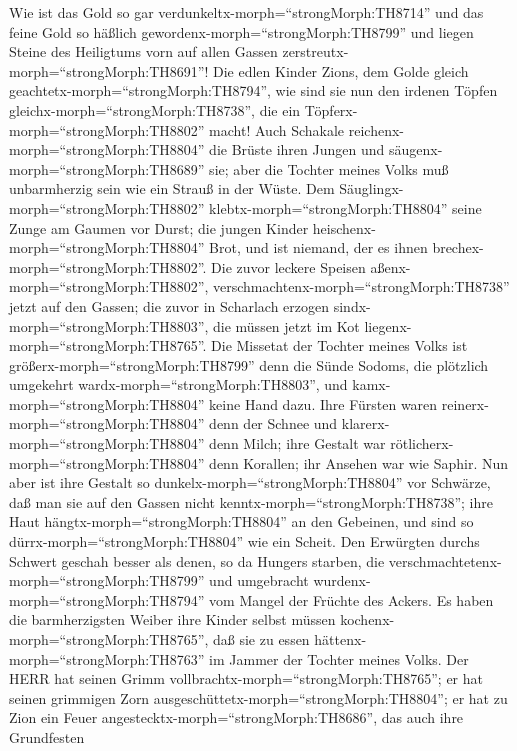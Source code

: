  Wie ist das Gold so gar
verdunkeltx-morph=``strongMorph:TH8714'' und das feine Gold so häßlich
gewordenx-morph=``strongMorph:TH8799'' und liegen Steine des Heiligtums
vorn auf allen Gassen zerstreutx-morph=``strongMorph:TH8691''!
 Die edlen Kinder Zions, dem Golde gleich
geachtetx-morph=``strongMorph:TH8794'', wie sind sie nun den irdenen
Töpfen gleichx-morph=``strongMorph:TH8738'', die ein
Töpferx-morph=``strongMorph:TH8802'' macht!  Auch Schakale
reichenx-morph=``strongMorph:TH8804'' die Brüste ihren Jungen und
säugenx-morph=``strongMorph:TH8689'' sie; aber die Tochter meines Volks
muß unbarmherzig sein wie ein Strauß in der Wüste.  Dem
Säuglingx-morph=``strongMorph:TH8802''
klebtx-morph=``strongMorph:TH8804'' seine Zunge am Gaumen vor Durst; die
jungen Kinder heischenx-morph=``strongMorph:TH8804'' Brot, und ist
niemand, der es ihnen brechex-morph=``strongMorph:TH8802''. 
Die zuvor leckere Speisen aßenx-morph=``strongMorph:TH8802'',
verschmachtenx-morph=``strongMorph:TH8738'' jetzt auf den Gassen; die
zuvor in Scharlach erzogen sindx-morph=``strongMorph:TH8803'', die
müssen jetzt im Kot liegenx-morph=``strongMorph:TH8765''. 
Die Missetat der Tochter meines Volks ist
größerx-morph=``strongMorph:TH8799'' denn die Sünde Sodoms, die
plötzlich umgekehrt wardx-morph=``strongMorph:TH8803'', und
kamx-morph=``strongMorph:TH8804'' keine Hand dazu.  Ihre
Fürsten waren reinerx-morph=``strongMorph:TH8804'' denn der Schnee und
klarerx-morph=``strongMorph:TH8804'' denn Milch; ihre Gestalt war
rötlicherx-morph=``strongMorph:TH8804'' denn Korallen; ihr Ansehen war
wie Saphir.  Nun aber ist ihre Gestalt so
dunkelx-morph=``strongMorph:TH8804'' vor Schwärze, daß man sie auf den
Gassen nicht kenntx-morph=``strongMorph:TH8738''; ihre Haut
hängtx-morph=``strongMorph:TH8804'' an den Gebeinen, und sind so
dürrx-morph=``strongMorph:TH8804'' wie ein Scheit.  Den
Erwürgten durchs Schwert geschah besser als denen, so da Hungers
starben, die verschmachtetenx-morph=``strongMorph:TH8799'' und
umgebracht wurdenx-morph=``strongMorph:TH8794'' vom Mangel der Früchte
des Ackers.  Es haben die barmherzigsten Weiber ihre Kinder
selbst müssen kochenx-morph=``strongMorph:TH8765'', daß sie zu essen
hättenx-morph=``strongMorph:TH8763'' im Jammer der Tochter meines Volks.
 Der HERR hat seinen Grimm
vollbrachtx-morph=``strongMorph:TH8765''; er hat seinen grimmigen Zorn
ausgeschüttetx-morph=``strongMorph:TH8804''; er hat zu Zion ein Feuer
angestecktx-morph=``strongMorph:TH8686'', das auch ihre Grundfesten

